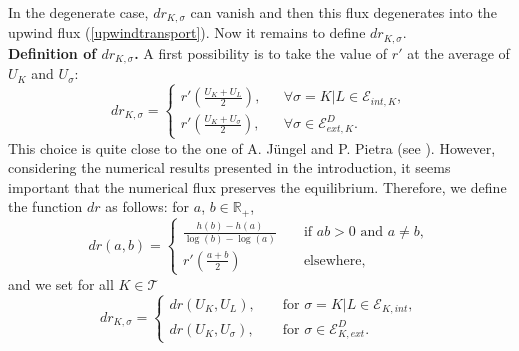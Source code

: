 \documentclass[smallextended]{svjour3}
\newcommand{\ds}{\displaystyle}
\begin{document}
In the degenerate case, $dr_{K,\sigma}$ can vanish and then this flux degenerates into the upwind flux (\ref{upwindtransport}). Now it remains to define $dr_{K,\sigma}$.\\
\newline
\textbf{Definition of $dr_{K,\sigma}$.} A first possibility is to take the value of $r'$ at the average of $U_{K}$ and $U_{\sigma}$:
\begin{equation}
dr_{K,\sigma}=\left\{\begin{array}{lll} \ds{r'\left(\frac{U_{K}+U_{L}}{2}\right),} & & \forall \sigma=K|L \in \mathcal{E}_{int,K}, \\ \ds{r'\left(\frac{U_{K}+U_{\sigma}}{2}\right),} & & \forall \sigma \in \mathcal{E}_{ext,K}^{D}. \end{array}\right.
\label{dr1}
\end{equation}
This choice is quite close to the one of A. Jüngel and P. Pietra (see \cite{Juengel1995,Juengel1997}). However, considering the numerical results presented in the introduction, it seems important that the numerical flux preserves the equilibrium. Therefore, we define the function $dr$ as follows: for $a$, $b \in \mathbb{R}_{+}$,
\begin{equation}
dr(a,b)=\left\{ \begin{array}{rll} \ds{\frac{h(b)-h(a)}{\log(b)-\log(a)}} & &\text{ if } ab>0 \text{ and } a \neq b,\\ \ds{r'\left(\frac{a+b}{2}\right)} & &\text{ elsewhere, } \end{array} \right.
\label{defdr}
\end{equation}
and we set for all $K \in \mathcal{T}$
\begin{equation}
dr_{K,\sigma}=\left\{\begin{array}{lll} dr(U_{K},U_{L}), & & \text{ for } \sigma=K|L \in \mathcal{E}_{K,int}, \\ dr(U_{K},U_{\sigma}), & & \text{ for } \sigma \in \mathcal{E}_{K,ext}^{D}.\end{array}\right.
\label{dr2}
\end{equation}
\end{document}
